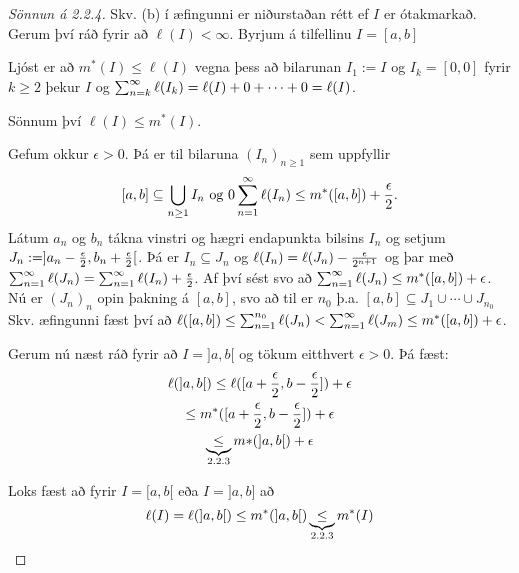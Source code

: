 \documentclass[12pt]{book}
\begin{document}
\section*{}
\begin{proof}[Sönnun á 2.2.4]
    Skv. (b) í æfingunni er niðurstaðan rétt ef $I$ er ótakmarkað. Gerum því ráð fyrir að $\ell(I) < \infty$. Byrjum á tilfellinu $I = [a,b]$

    \begin{ath}
        Ljóst er að $m^{*}(I) \leq \ell(I)$ vegna þess að bilarunan $I_1 := I$ og $I_k = [0,0]$
        fyrir $k \geq 2$ þekur $I$ og $\sum_{n = {k}}^{\infty} \ell(I_k) = \ell(I) + 0 + \dotsb + 0 = \ell(I)$.
        
        Sönnum því $\ell(I) \leq m^{*} (I)$.
    \end{ath}
    Gefum okkur $\epsilon > 0$. Þá er til bilaruna $(I_n)_{n \geq 1}$ sem uppfyllir
    \[[a,b] \subseteq \bigcup_{n \geq 1} I_n \text{ og } 0 \sum_{n = 1}^{\infty} \ell(I_n) \leq m^{*}([a,b]) + \frac{\epsilon}{2}.\]
    Látum $a_n$ og $b_n$ tákna vinstri og hægri endapunkta bilsins $I_n$ og setjum $J_n := ]a_n - \frac{\epsilon}{2}, b_n + \frac{\epsilon}{2}[$.
    Þá er $I_n \subseteq J_n$ og $\ell(I_n) = \ell(J_n) - \frac{\epsilon}{2^{n+1}}$ og þar með $\sum_{n = 1}^{\infty} \ell(J_n) = \sum_{n = 1}^{\infty} \ell(I_n) + \frac{\epsilon}{2}$.
    Af því sést svo að $\sum_{n = 1}^{\infty} \ell(J_n) \leq m^{*}([a,b]) + \epsilon$.
    Nú er $(J_n)_n$ opin þakning á $[a,b]$, svo að til er $n_0$ þ.a. $[a,b] \subseteq J_1 \cup \dotsb \cup J_{n_0}$
    Skv. æfingunni fæst því að $\ell([a,b]) \leq \sum_{n =1}^{n_0} \ell(J_n) < \sum_{n = 1}^{\infty} \ell(J_m) \leq m^{*} ([a,b]) + \epsilon$.

    Gerum nú næst ráð fyrir að $I = ]a,b[$ og tökum eitthvert $\epsilon > 0$. Þá fæst:
    \begin{gather*}
      \ell(]a,b[)  \leq \ell([a + \frac{\epsilon}{2}, b - \frac{\epsilon}{2}]) + \epsilon \\
      \leq m^{*}([a + \frac{\epsilon}{2}, b - \frac{\epsilon}{2}]) + \epsilon \\
      \underbrace{\leq}_{\text{2.2.3}} m{*}(]a,b[) + \epsilon
    \end{gather*}


    Loks fæst að fyrir $I = [a,b[$ eða $I = ]a,b]$ að
    \[\ell(I) = \ell(]a,b[) \leq m^*(]a,b[) \underbrace{\leq}_{\text{2.2.3}} m^*(I)\]
\end{proof}
\end{document}
